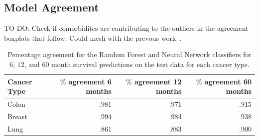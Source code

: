 \documentclass[a4paper,11pt]{article}
\newcommand{\codewhite}[1]{\colorbox{white}{\texttt{#1}}}
\begin{document}





\subsection{Model Agreement}

TO DO: Check if comorbidites are contributing to the outliers in the agreement boxplots that follow.
Could mesh with the prevous work~\cite{ISI:000355882700012}.


\begin{table}[tbp]
\begin{center}
\begin{tabular}{lrrr}
\toprule
Cancer Type & $\%$ agreement 6 months & $\%$ agreement 12 months & $\%$ agreement 60 months \\ 
\midrule
Colon & .981 & .971 & .915 \\  
Breast & .994 & .984 & .938 \\  
Lung & .861 & .883 & .900 \\  
\bottomrule
\end{tabular}
\caption{\label{tab:agree} Percentage agreement for the Random Forest and Neural Network classifiers for 6, 12, and 60 month survival predictions on the test data for each cancer type.}
\end{center}
\end{table}
\end{document}
